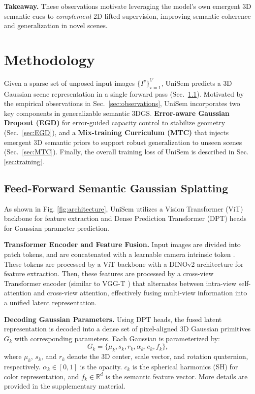 \documentclass[runningheads]{llncs}
\begin{document}
\noindent\textbf{Takeaway.}
These observations motivate leveraging the model's own emergent 3D semantic cues to \emph{complement} 2D-lifted supervision, improving semantic coherence and generalization in novel scenes.





\section{Methodology} \label{sec:method}
Given a sparse set of unposed input images $\{I^v\}_{v=1}^V$, UniSem predicts a 3D Gaussian scene representation in a single forward pass (Sec.~\ref{sec:FeedforwadGS}).
Motivated by the empirical observations in Sec.~\ref{sec:observations}, UniSem incorporates two key components in generalizable semantic 3DGS. 
\textbf{Error-aware Gaussian Dropout (EGD)} for error-guided capacity control to stabilize geometry (Sec.~\ref{sec:EGD}), and a \textbf{Mix-training Curriculum (MTC)} that injects emergent 3D semantic priors to support robust generalization to unseen scenes (Sec.~\ref{sec:MTC}).
Finally, the overall training loss of UniSem is described in Sec. \ref{sec:training}.



\subsection{Feed-Forward Semantic Gaussian Splatting}  \label{sec:FeedforwadGS}
As shown in Fig. \ref{fig:architecture}, UniSem utilizes a Vision Transformer (ViT) \cite{vit} backbone for feature extraction and Dense Prediction Transformer (DPT) \cite{dpt} heads for Gaussian parameter prediction. 

\noindent
\textbf{Transformer Encoder and Feature Fusion.}   %
Input images are divided into patch tokens, and are concatenated with a learnable camera intrinsic token \cite{noposplat}. These tokens are processed by a ViT backbone with a DINOv2 architecture \cite{dinov2} for feature extraction. 
Then, these features are processed by a cross-view Transformer encoder (similar to VGG-T \cite{vggt}) that alternates between intra-view self-attention and cross-view attention, effectively fusing multi-view information into a unified latent representation. 


\noindent
\textbf{Decoding Gaussian Parameters.} 
Using DPT heads, the fused latent representation is decoded into a dense set of pixel-aligned 3D Gaussian primitives $G_k$ with corresponding parameters. Each Gaussian is parameterized by: 
\begin{equation}
G_{k} = \{\mu_{k}, s_{k}, r_{k}, \alpha_{k}, c_{k}, f_{k}\}, 
\label{eq:gaussian_params}
\end{equation}
where $\mu_{k}$, $s_{k}$, and $r_{k}$ denote the 3D center, scale vector, and rotation quaternion, respectively. $\alpha_{k} \in [0, 1]$ is the opacity. $c_{k}$ is the spherical harmonics (SH) for color representation, and $f_{k} \in \mathbb{R}^d$ is the semantic feature vector. 
More details are provided in the supplementary material. 
\end{document}
